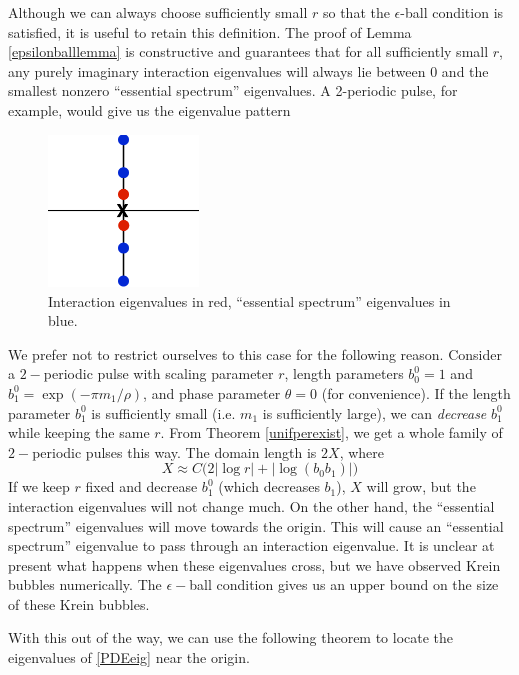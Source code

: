 \documentclass[thesis.tex]{subfiles}
\begin{document}
Although we can always choose sufficiently small $r$ so that the $\epsilon$-ball condition is satisfied, it is useful to retain this definition. The proof of Lemma \ref{epsilonballlemma} is constructive and guarantees that for all sufficiently small $r$, any purely imaginary interaction eigenvalues will always lie between 0 and the smallest nonzero ``essential spectrum'' eigenvalues. A 2-periodic pulse, for example, would give us the eigenvalue pattern

\begin{figure}[H]
\begin{center}
\includegraphics[width=4cm]{periodic/2pulseess}
\end{center}
\caption{Interaction eigenvalues in red, ``essential spectrum'' eigenvalues in blue.}
\end{figure}

We prefer not to restrict ourselves to this case for the following reason. Consider a $2-$periodic pulse with scaling parameter $r$, length parameters $b_0^0 = 1$ and $b_1^0 = \exp(-\pi m_1/\rho)$, and phase parameter $\theta = 0$ (for convenience). If the length parameter $b_1^0$ is sufficiently small (i.e. $m_1$ is sufficiently large), we can \emph{decrease} $b_1^0$ while keeping the same $r$. From Theorem \ref{unifperexist}, we get a whole family of $2-$periodic pulses this way. The domain length is $2X$, where
\[
X \approx C \Big( 2 |\log r| + |\log(b_0 b_1)| \Big)
\]
If we keep $r$ fixed and decrease $b_1^0$ (which decreases $b_1$), $X$ will grow, but the interaction eigenvalues will not change much. On the other hand, the ``essential spectrum'' eigenvalues will move towards the origin. This will cause an ``essential spectrum'' eigenvalue to pass through an interaction eigenvalue. It is unclear at present what happens when these eigenvalues cross, but we have observed Krein bubbles numerically. The $\epsilon-$ball condition gives us an upper bound on the size of these Krein bubbles.

With this out of the way, we can use the following theorem to locate the eigenvalues of \eqref{PDEeig} near the origin.
\end{document}
